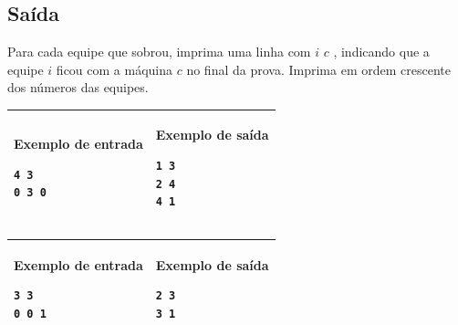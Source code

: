 \subsection*{Saída}

Para cada equipe que sobrou, imprima uma linha
com $i$ $c$ , indicando que a equipe $i$ ficou com a máquina $c$ no
final da prova.
Imprima em ordem crescente dos números das equipes.

\vspace{-0.3cm}
\begin{table}[!h]
\centering
\begin{tabular}{|l|l|}
\hline
\begin{minipage}[t]{3in}
\textbf{Exemplo de entrada}
\begin{verbatim}
4 3
0 3 0
\end{verbatim}
\vspace{1mm}
\end{minipage}
&
\begin{minipage}[t]{3in}
\textbf{Exemplo de saída}
\begin{verbatim}
1 3
2 4
4 1
\end{verbatim}
\vspace{1mm}
\end{minipage} \\
\hline
\end{tabular}
\end{table}

\vspace{-0.3cm}
\begin{table}[!h]
\centering
\begin{tabular}{|l|l|}
\hline
\begin{minipage}[t]{3in}
\textbf{Exemplo de entrada}
\begin{verbatim}
3 3
0 0 1
\end{verbatim}
\vspace{1mm}
\end{minipage}
&
\begin{minipage}[t]{3in}
\textbf{Exemplo de saída}
\begin{verbatim}
2 3
3 1
\end{verbatim}
\vspace{1mm}
\end{minipage} \\
\hline
\end{tabular}
\end{table}
